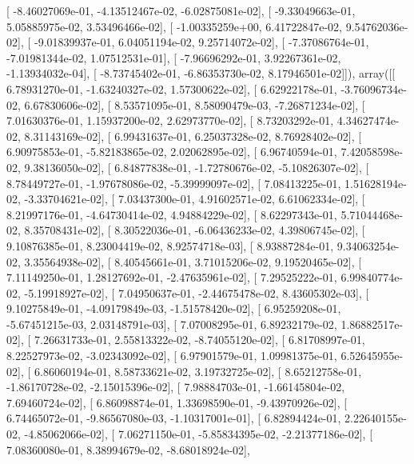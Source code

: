 \documentclass{article}
\begin{document}
       [ -8.46027069e-01,  -4.13512467e-02,  -6.02875081e-02],
       [ -9.33049663e-01,   5.05885975e-02,   3.53496466e-02],
       [ -1.00335259e+00,   6.41722847e-02,   9.54762036e-02],
       [ -9.01839937e-01,   6.04051194e-02,   9.25714072e-02],
       [ -7.37086764e-01,  -7.01981344e-02,   1.07512531e-01],
       [ -7.96696292e-01,   3.92267361e-02,  -1.13934032e-04],
       [ -8.73745402e-01,  -6.86353730e-02,   8.17946501e-02]]), array([[  6.78931270e-01,  -1.63240327e-02,   1.57300622e-02],
       [  6.62922178e-01,  -3.76096734e-02,   6.67830606e-02],
       [  8.53571095e-01,   8.58090479e-03,  -7.26871234e-02],
       [  7.01630376e-01,   1.15937200e-02,   2.62973770e-02],
       [  8.73203292e-01,   4.34627474e-02,   8.31143169e-02],
       [  6.99431637e-01,   6.25037328e-02,   8.76928402e-02],
       [  6.90975853e-01,  -5.82183865e-02,   2.02062895e-02],
       [  6.96740594e-01,   7.42058598e-02,   9.38136050e-02],
       [  6.84877838e-01,  -1.72780676e-02,  -5.10826307e-02],
       [  8.78449727e-01,  -1.97678086e-02,  -5.39999097e-02],
       [  7.08413225e-01,   1.51628194e-02,  -3.33704621e-02],
       [  7.03437300e-01,   4.91602571e-02,   6.61062334e-02],
       [  8.21997176e-01,  -4.64730414e-02,   4.94884229e-02],
       [  8.62297343e-01,   5.71044468e-02,   8.35708431e-02],
       [  8.30522036e-01,  -6.06436233e-02,   4.39806745e-02],
       [  9.10876385e-01,   8.23004419e-02,   8.92574718e-03],
       [  8.93887284e-01,   9.34063254e-02,   3.35564938e-02],
       [  8.40545661e-01,   3.71015206e-02,   9.19520465e-02],
       [  7.11149250e-01,   1.28127692e-01,  -2.47635961e-02],
       [  7.29525222e-01,   6.99840774e-02,  -5.19918927e-02],
       [  7.04950637e-01,  -2.44675478e-02,   8.43605302e-03],
       [  9.10275849e-01,  -4.09179849e-03,  -1.51578420e-02],
       [  6.95259208e-01,  -5.67451215e-03,   2.03148791e-03],
       [  7.07008295e-01,   6.89232179e-02,   1.86882517e-02],
       [  7.26631733e-01,   2.55813322e-02,  -8.74055120e-02],
       [  6.81708997e-01,   8.22527973e-02,  -3.02343092e-02],
       [  6.97901579e-01,   1.09981375e-01,   6.52645955e-02],
       [  6.86060194e-01,   8.58733621e-02,   3.19732725e-02],
       [  8.65212758e-01,  -1.86170728e-02,  -2.15015396e-02],
       [  7.98884703e-01,  -1.66145804e-02,   7.69460724e-02],
       [  6.86098874e-01,   1.33698590e-01,  -9.43970926e-02],
       [  6.74465072e-01,  -9.86567080e-03,  -1.10317001e-01],
       [  6.82894424e-01,   2.22640155e-02,  -4.85062066e-02],
       [  7.06271150e-01,  -5.85834395e-02,  -2.21377186e-02],
       [  7.08360080e-01,   8.38994679e-02,  -8.68018924e-02],
\end{document}
